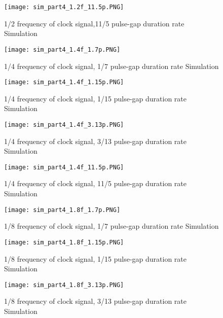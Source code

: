 \documentclass[pdftex,12pt,a4paper]{article}
\begin{document}
\begin{figure}[ht]
	\centering
	\texttt{[image: sim\_part4\_1.2f\_11.5p.PNG]}	
	\caption{1/2 frequency of clock signal,11/5 pulse-gap duration rate Simulation}
	\label{fig14}
\end{figure}

\begin{figure}[ht]
	\centering
	\texttt{[image: sim\_part4\_1.4f\_1.7p.PNG]}	
	\caption{1/4 frequency of clock signal, 1/7 pulse-gap duration rate Simulation}
	\label{fig15}
\end{figure}

\begin{figure}[ht]
	\centering
	\texttt{[image: sim\_part4\_1.4f\_1.15p.PNG]}	
	\caption{1/4 frequency of clock signal, 1/15 pulse-gap duration rate Simulation}
	\label{fig16}
\end{figure}

\begin{figure}[ht]
	\centering
	\texttt{[image: sim\_part4\_1.4f\_3.13p.PNG]}	
	\caption{1/4 frequency of clock signal, 3/13 pulse-gap duration rate Simulation}
	\label{fig17}
\end{figure}

\begin{figure}[ht]
	\centering
	\texttt{[image: sim\_part4\_1.4f\_11.5p.PNG]}	
	\caption{1/4 frequency of clock signal, 11/5 pulse-gap duration rate Simulation}
	\label{fig18}
\end{figure}

\begin{figure}[ht]
	\centering
	\texttt{[image: sim\_part4\_1.8f\_1.7p.PNG]}	
	\caption{1/8 frequency of clock signal, 1/7 pulse-gap duration rate Simulation}
	\label{fig19}
\end{figure}

\begin{figure}[ht]
	\centering
	\texttt{[image: sim\_part4\_1.8f\_1.15p.PNG]}	
	\caption{1/8 frequency of clock signal, 1/15 pulse-gap duration rate Simulation}
	\label{fig20}
\end{figure}

\begin{figure}[ht]
	\centering
	\texttt{[image: sim\_part4\_1.8f\_3.13p.PNG]}	
	\caption{1/8 frequency of clock signal, 3/13 pulse-gap duration rate Simulation}
	\label{fig21}
\end{figure}
\end{document}
